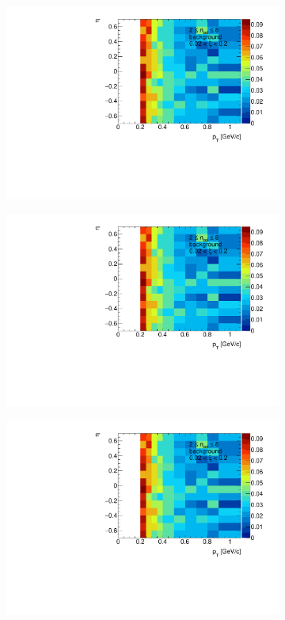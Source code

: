 \begin{figure}[h!]
	\centering
	\begin{subfigure}{.47\textwidth}
		\includegraphics[width=\linewidth, page=1]{chapters/chrgSTAR/img/chargedBkg/bkg2D.pdf}
	\end{subfigure}
	\begin{subfigure}{.47\textwidth}
		\includegraphics[width=\linewidth, page=3]{chapters/chrgSTAR/img/chargedBkg/bkg2D.pdf}
	\end{subfigure}
	\begin{subfigure}{.47\textwidth}
		\includegraphics[width=\linewidth, page=4]{chapters/chrgSTAR/img/chargedBkg/bkg2D.pdf}

\end{subfigure}
\end{figure}
